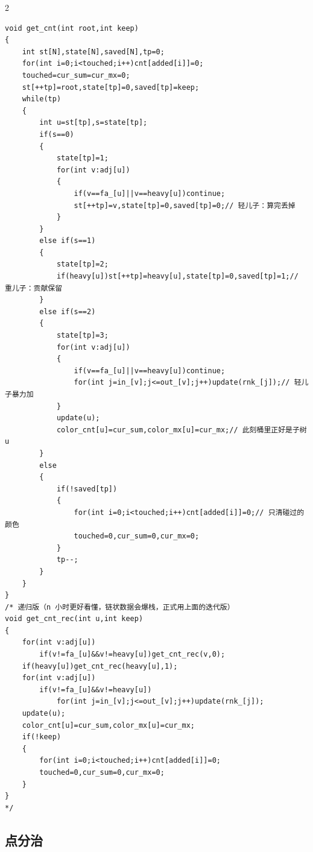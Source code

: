 \documentclass[UTF8,fontset=fandol,a4paper,twoside]{ctexart}
\begin{document}
\begin{multicols}{2}
\begin{lstlisting}
void get_cnt(int root,int keep)
{
    int st[N],state[N],saved[N],tp=0;
    for(int i=0;i<touched;i++)cnt[added[i]]=0;
    touched=cur_sum=cur_mx=0;
    st[++tp]=root,state[tp]=0,saved[tp]=keep;
    while(tp)
    {
        int u=st[tp],s=state[tp];
        if(s==0)
        {
            state[tp]=1;
            for(int v:adj[u])
            {
                if(v==fa_[u]||v==heavy[u])continue;
                st[++tp]=v,state[tp]=0,saved[tp]=0;// 轻儿子：算完丢掉
            }
        }
        else if(s==1)
        {
            state[tp]=2;
            if(heavy[u])st[++tp]=heavy[u],state[tp]=0,saved[tp]=1;// 重儿子：贡献保留
        }
        else if(s==2)
        {
            state[tp]=3;
            for(int v:adj[u])
            {
                if(v==fa_[u]||v==heavy[u])continue;
                for(int j=in_[v];j<=out_[v];j++)update(rnk_[j]);// 轻儿子暴力加
            }
            update(u);
            color_cnt[u]=cur_sum,color_mx[u]=cur_mx;// 此刻桶里正好是子树 u
        }
        else
        {
            if(!saved[tp])
            {
                for(int i=0;i<touched;i++)cnt[added[i]]=0;// 只清碰过的颜色
                touched=0,cur_sum=0,cur_mx=0;
            }
            tp--;
        }
    }
}
/* 递归版（n 小时更好看懂，链状数据会爆栈，正式用上面的迭代版）
void get_cnt_rec(int u,int keep)
{
    for(int v:adj[u])
        if(v!=fa_[u]&&v!=heavy[u])get_cnt_rec(v,0);
    if(heavy[u])get_cnt_rec(heavy[u],1);
    for(int v:adj[u])
        if(v!=fa_[u]&&v!=heavy[u])
            for(int j=in_[v];j<=out_[v];j++)update(rnk_[j]);
    update(u);
    color_cnt[u]=cur_sum,color_mx[u]=cur_mx;
    if(!keep)
    {
        for(int i=0;i<touched;i++)cnt[added[i]]=0;
        touched=0,cur_sum=0,cur_mx=0;
    }
}
*/
\end{lstlisting}
\subsection{点分治}


\end{multicols}
\end{document}
